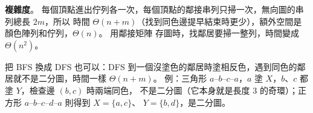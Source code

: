 \begin{pastsoln}
\textbf{複雜度}。 每個頂點進出佇列各一次，每個頂點的鄰接串列只掃一次，無向圖的串列總長 $2m$，所以
時間 $\Theta(n + m)$（找到同色邊提早結束時更少），額外空間是顏色陣列和佇列，$\Theta(n)$。 用鄰接矩陣
存圖時，找鄰居要掃一整列，時間變成 $\Theta(n^2)$。

把 BFS 換成 DFS 也可以：DFS 到一個沒塗色的鄰居時塗相反色，遇到同色的鄰居就不是二分圖，時間一樣
$\Theta(n + m)$。 例：三角形 $a$--$b$--$c$--$a$，$a$ 塗 $X$，$b$、$c$ 都塗 $Y$，檢查邊 $(b, c)$ 時兩端同色，
不是二分圖（它本身就是長度 $3$ 的奇環）；正方形 $a$--$b$--$c$--$d$--$a$ 則得到 $X = \{a, c\}$、
$Y = \{b, d\}$，是二分圖。
\end{pastsoln}

